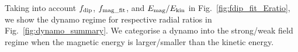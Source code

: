 

{\color{red}
Taking into account $f_{\rm dip}$, $f_{\rm mag\_fit}$, and $E_{\rm mag}/E_{\rm kin}$ in Fig.~\ref{fig:fdip_fit_Eratio}, we show the dynamo regime for respective radial ratios in Fig.~\ref{fig:dynamo_summary}.
We categorise a dynamo into the strong/weak field regime when the magnetic energy is larger/smaller than the kinetic energy.
}
